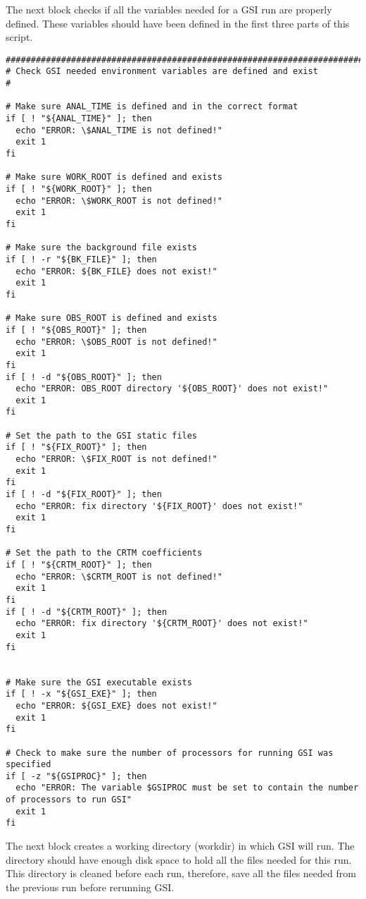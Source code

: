 The next block checks if all the variables needed for a GSI run are properly defined. These variables should have been defined in the first three parts of this script. 

\begin{scriptsize}
\begin{verbatim}
##################################################################################
# Check GSI needed environment variables are defined and exist
#

# Make sure ANAL_TIME is defined and in the correct format
if [ ! "${ANAL_TIME}" ]; then
  echo "ERROR: \$ANAL_TIME is not defined!"
  exit 1
fi

# Make sure WORK_ROOT is defined and exists
if [ ! "${WORK_ROOT}" ]; then
  echo "ERROR: \$WORK_ROOT is not defined!"
  exit 1
fi

# Make sure the background file exists
if [ ! -r "${BK_FILE}" ]; then
  echo "ERROR: ${BK_FILE} does not exist!"
  exit 1
fi

# Make sure OBS_ROOT is defined and exists
if [ ! "${OBS_ROOT}" ]; then
  echo "ERROR: \$OBS_ROOT is not defined!"
  exit 1
fi
if [ ! -d "${OBS_ROOT}" ]; then
  echo "ERROR: OBS_ROOT directory '${OBS_ROOT}' does not exist!"
  exit 1
fi

# Set the path to the GSI static files
if [ ! "${FIX_ROOT}" ]; then
  echo "ERROR: \$FIX_ROOT is not defined!"
  exit 1
fi
if [ ! -d "${FIX_ROOT}" ]; then
  echo "ERROR: fix directory '${FIX_ROOT}' does not exist!"
  exit 1
fi

# Set the path to the CRTM coefficients
if [ ! "${CRTM_ROOT}" ]; then
  echo "ERROR: \$CRTM_ROOT is not defined!"
  exit 1
fi
if [ ! -d "${CRTM_ROOT}" ]; then
  echo "ERROR: fix directory '${CRTM_ROOT}' does not exist!"
  exit 1
fi


# Make sure the GSI executable exists
if [ ! -x "${GSI_EXE}" ]; then
  echo "ERROR: ${GSI_EXE} does not exist!"
  exit 1
fi

# Check to make sure the number of processors for running GSI was specified
if [ -z "${GSIPROC}" ]; then
  echo "ERROR: The variable $GSIPROC must be set to contain the number of processors to run GSI"
  exit 1
fi

\end{verbatim}
\end{scriptsize}

The next block creates a working directory (workdir) in which GSI will run. The directory should have enough disk space to hold all the files needed for this run. This directory is cleaned before each run, therefore, save all the files needed from the previous run before rerunning GSI.

